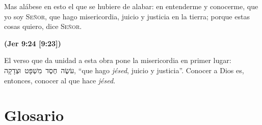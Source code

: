 \documentclass[11pt,letterpaper]{article}
\newcommand{\heb}[1]{\mbox{\foreignlanguage{hebrew}{#1}}}
\newcommand{\SENOR}{\textsc{Señor}}
\newcommand{\fuente}[1]{\par\hfill{\upshape\bfseries\small\textcolor{azul}{#1}}}
\begin{document}
\begin{cita}Mas alábese en esto el que se hubiere de alabar: en entenderme y conocerme, que yo soy \SENOR, que hago misericordia, juicio y justicia en la tierra; porque estas cosas quiero, dice \SENOR.\fuente{(Jer 9:24 [9:23])}\end{cita}

El verso que da unidad a esta obra pone la misericordia en primer lugar: \heb{עֹשֶׂה חֶסֶד מִשְׁפָּט וּצְדָקָה}, ``que hago \emph{jésed}, juicio y justicia''. Conocer a Dios es, entonces, conocer al que hace \emph{jésed}.

\section*{Glosario}
\end{document}
